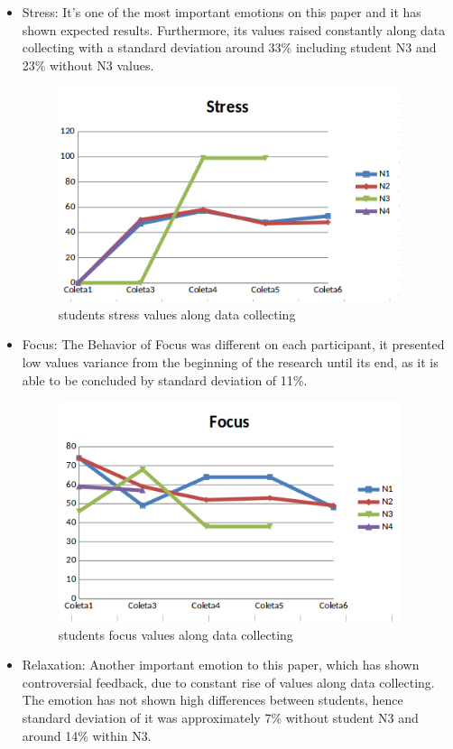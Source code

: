 \documentclass[12pt,openright,a4paper]{article}
\begin{document}
 \begin{itemize}
 	\item Stress: It’s one of the most important emotions on this paper and it has shown expected results. Furthermore, its values raised constantly along data collecting with a standard deviation around 33\% including student N3 and 23\% without N3 values.
 	  \begin{figure}[H]
 	  	\centering
 	  	\includegraphics[width=10cm]{./stress.png}
 	  	\caption{students stress values along data collecting}
 	  \end{figure}
 	\item Focus: The Behavior of Focus was different on each participant, it presented low values variance from the beginning of the research until its end, as it is able to be concluded by standard deviation of 11\%. 
 	   \begin{figure}[H]
 	  	\centering
 	  	\includegraphics[width=10cm]{./focus.png}
 	  	\caption{students focus values along data collecting}
 	  \end{figure}
 	\item Relaxation: Another important emotion to this paper, which has shown controversial feedback, due to constant rise of values along data collecting. The emotion has not shown high differences between students, hence standard deviation of it was approximately 7\% without student N3 and around 14\% within N3.

\end{itemize}
\end{document}
